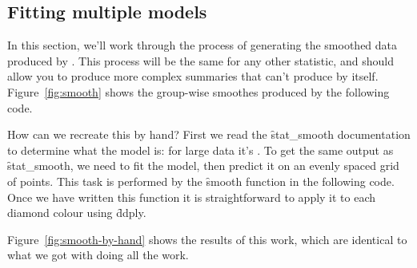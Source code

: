 \subsection{Fitting multiple models}
\label{sub:multiple_models}

In this section, we'll work through the process of generating the smoothed data produced by .  This process will be the same for any other statistic, and should allow you to produce more complex summaries that \ggplot can't produce by itself.  Figure~\ref{fig:smooth} shows the group-wise smoothes produced by the following code.

% 


How can we recreate this by hand?  First we read the \f{stat_smooth} documentation to determine what the model is: for large data it's .  To get the same output as \f{stat_smooth}, we need to fit the model, then predict it on an evenly spaced grid of points. This task is performed by the \f{smooth} function in the following code.  Once we have written this function it is straightforward to apply it to each diamond colour  using \f{ddply}.

Figure~\ref{fig:smooth-by-hand} shows the results of this work, which are identical to what we got with \ggplot doing all the work.

% 
%   


